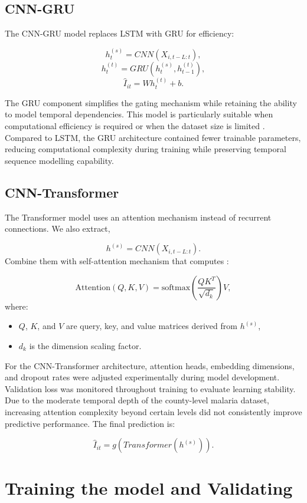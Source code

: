 \subsection{CNN-GRU}

The CNN-GRU model replaces LSTM with GRU for efficiency:

\[
h^{(s)}_t = CNN(X_{i,t-L:t}),
\]
\[
h^{(t)}_t = GRU(h^{(s)}_t, h^{(t)}_{t-1}),
\]
\[
\hat{I}_{it} = W h^{(t)}_t + b.
\]

The GRU component simplifies the gating mechanism while retaining the ability to model temporal dependencies. This model is particularly suitable when computational efficiency is required or when the dataset size is limited \cite{Muriithi2024A}. Compared to LSTM, the GRU architecture contained fewer trainable parameters, reducing computational complexity during training while preserving temporal sequence modelling capability.

\subsection{CNN-Transformer}

The Transformer model uses an attention mechanism instead of recurrent connections. We also extract,

\[
h^{(s)} = CNN(X_{i,t-L:t}).
\]
Combine them with  self-attention mechanism that computes :

\[
\text{Attention}(Q,K,V) = \text{softmax} \left( \frac{QK^T}{\sqrt{d_k}} \right) V,
\]
where:
\begin{itemize}
	\item $Q$, $K$, and $V$ are query, key, and value matrices derived from $h^{(s)}$,
	\item $d_k$ is the dimension scaling factor.
\end{itemize}
For the CNN-Transformer architecture, attention heads, embedding dimensions, and dropout rates were adjusted experimentally during model development. Validation loss was monitored throughout training to evaluate learning stability. Due to the moderate temporal depth of the county-level malaria dataset, increasing attention complexity beyond certain levels did not consistently improve predictive performance\cite{Vaswani2017}.
The final prediction is:

\[
\hat{I}_{it} = g(Transformer(h^{(s)})).
\]

\section{Training the model and Validating}

